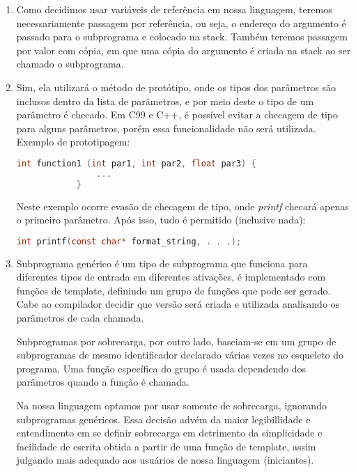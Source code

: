 \documentclass[12pt, a4paper]{article}
\begin{document}
\begin{enumerate}
        \item
        Como decidimos usar variáveis de referência em nossa linguagem, teremos
        necessariamente passagem por referência, ou seja, o endereço do
        argumento é passado para o subprograma e colocado na stack. Também
        teremos passagem por valor com cópia, em que uma cópia do argumento é
        criada na stack ao ser chamado o subprograma.

        \item
        Sim, ela utilizará o método de protótipo, onde os tipos dos parâmetros são inclusos dentro da lista de parâmetros, e por meio deste o tipo de um parâmetro é checado. Em C99 e C++, é possível evitar a checagem de tipo para alguns parâmetros, porém essa funcionalidade não será utilizada.
        Exemplo de prototipagem:
        \begin{lstlisting}[language=C]
            int function1 (int par1, int par2, float par3) {
            	...
            }
        \end{lstlisting}
        Neste exemplo ocorre evasão de checagem de tipo, onde \emph{printf} checará apenas o primeiro parâmetro. Após isso, tudo é permitido (inclusive nada):
        \begin{lstlisting}[language=C]
            int printf(const char* format_string, . . .);
        \end{lstlisting}
        
        \item
        Subprograma genérico é um tipo de subprograma que funciona para
        diferentes tipos de entrada em diferentes ativações, é implementado com
        funções de template,  definindo um grupo de funções que pode ser
        gerado. Cabe ao compilador decidir que versão será criada e utilizada 
        analisando os parâmetros de cada chamada.

        Subprogramas por sobrecarga, por outro lado, baseiam-se em um grupo de
        subprogramas de mesmo identificador declarado várias vezes no esqueleto
        do programa. Uma função específica do grupo é usada dependendo dos
        parâmetros quando a função é chamada.

        Na nossa linguagem optamos por usar somente de sobrecarga, ignorando
        subprogramas genéricos. Essa decisão advém da maior legibillidade e 
        entendimento em se definir sobrecarga em detrimento da simplicidade e 
        facilidade de escrita obtida a partir de uma função de template, assim 
        julgando mais adequado aos usuários de nossa linguagem (iniciantes).


\end{enumerate}
\end{document}
